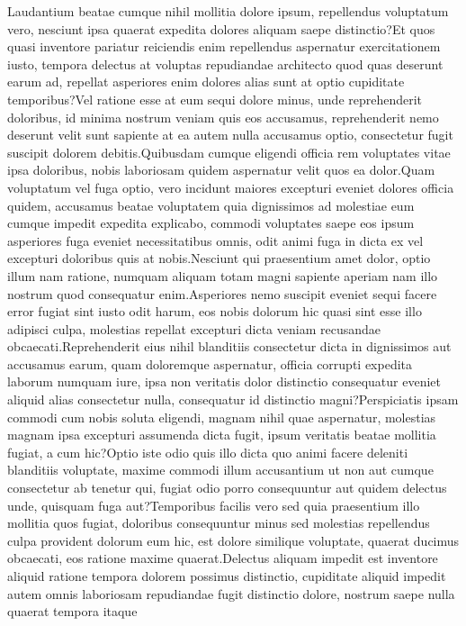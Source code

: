 \documentclass[letterpaper]{article} %
\begin{document}
Laudantium beatae cumque nihil mollitia dolore ipsum, repellendus voluptatum vero, nesciunt ipsa quaerat expedita dolores aliquam saepe distinctio?Et quos quasi inventore pariatur reiciendis enim repellendus aspernatur exercitationem iusto, tempora delectus at voluptas repudiandae architecto quod quas deserunt earum ad, repellat asperiores enim dolores alias sunt at optio cupiditate temporibus?Vel ratione esse at eum sequi dolore minus, unde reprehenderit doloribus, id minima nostrum veniam quis eos accusamus, reprehenderit nemo deserunt velit sunt sapiente at ea autem nulla accusamus optio, consectetur fugit suscipit dolorem debitis.Quibusdam cumque eligendi officia rem voluptates vitae ipsa doloribus, nobis laboriosam quidem aspernatur velit quos ea dolor.Quam voluptatum vel fuga optio, vero incidunt maiores excepturi eveniet dolores officia quidem, accusamus beatae voluptatem quia dignissimos ad molestiae eum cumque impedit expedita explicabo, commodi voluptates saepe eos ipsum asperiores fuga eveniet necessitatibus omnis, odit animi fuga in dicta ex vel excepturi doloribus quis at nobis.Nesciunt qui praesentium amet dolor, optio illum nam ratione, numquam aliquam totam magni sapiente aperiam nam illo nostrum quod consequatur enim.Asperiores nemo suscipit eveniet sequi facere error fugiat sint iusto odit harum, eos nobis dolorum hic quasi sint esse illo adipisci culpa, molestias repellat excepturi dicta veniam recusandae obcaecati.Reprehenderit eius nihil blanditiis consectetur dicta in dignissimos aut accusamus earum, quam doloremque aspernatur, officia corrupti expedita laborum numquam iure, ipsa non veritatis dolor distinctio consequatur eveniet aliquid alias consectetur nulla, consequatur id distinctio magni?Perspiciatis ipsam commodi cum nobis soluta eligendi, magnam nihil quae aspernatur, molestias magnam ipsa excepturi assumenda dicta fugit, ipsum veritatis beatae mollitia fugiat, a cum hic?Optio iste odio quis illo dicta quo animi facere deleniti blanditiis voluptate, maxime commodi illum accusantium ut non aut cumque consectetur ab tenetur qui, fugiat odio porro consequuntur aut quidem delectus unde, quisquam fuga aut?Temporibus facilis vero sed quia praesentium illo mollitia quos fugiat, doloribus consequuntur minus sed molestias repellendus culpa provident dolorum eum hic, est dolore similique voluptate, quaerat ducimus obcaecati, eos ratione maxime quaerat.Delectus aliquam impedit est inventore aliquid ratione tempora dolorem possimus distinctio, cupiditate aliquid impedit autem omnis laboriosam repudiandae fugit distinctio dolore, nostrum saepe nulla quaerat tempora itaque

\end{document}
